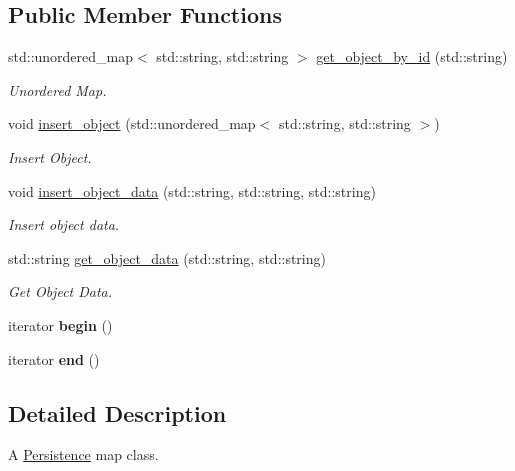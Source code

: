 \subsection*{Public Member Functions}
\begin{DoxyCompactItemize}
\item 
std\+::unordered\+\_\+map$<$ std\+::string, std\+::string $>$ \hyperlink{classengine_1_1_persistence_map_a2384a770ad55e71db81e3a9736e3bcd9}{get\+\_\+object\+\_\+by\+\_\+id} (std\+::string)
\begin{DoxyCompactList}\small\item\em Unordered Map. \end{DoxyCompactList}\item 
void \hyperlink{classengine_1_1_persistence_map_af7ab5be461caff60a22523ed2d9d91d8}{insert\+\_\+object} (std\+::unordered\+\_\+map$<$ std\+::string, std\+::string $>$)
\begin{DoxyCompactList}\small\item\em Insert Object. \end{DoxyCompactList}\item 
void \hyperlink{classengine_1_1_persistence_map_a3a0b83db916b9488ebdf1be39db15c6e}{insert\+\_\+object\+\_\+data} (std\+::string, std\+::string, std\+::string)
\begin{DoxyCompactList}\small\item\em Insert object data. \end{DoxyCompactList}\item 
std\+::string \hyperlink{classengine_1_1_persistence_map_a49b1c1a07503bb93ce7ca5fb4ebc92ee}{get\+\_\+object\+\_\+data} (std\+::string, std\+::string)
\begin{DoxyCompactList}\small\item\em Get Object Data. \end{DoxyCompactList}\item 
iterator {\bfseries begin} ()\hypertarget{classengine_1_1_persistence_map_a5471e31f0aee2f59f51680365ac318d4}{}\label{classengine_1_1_persistence_map_a5471e31f0aee2f59f51680365ac318d4}

\item 
iterator {\bfseries end} ()\hypertarget{classengine_1_1_persistence_map_a4bd8c7b1bbf4938fc54d9b933d19af4e}{}\label{classengine_1_1_persistence_map_a4bd8c7b1bbf4938fc54d9b933d19af4e}

\end{DoxyCompactItemize}


\subsection{Detailed Description}
A \hyperlink{classengine_1_1_persistence}{Persistence} map class. 

